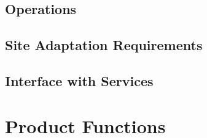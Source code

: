 \documentclass{scrreprt}
\begin{document}
\subsection{Operations}

\subsection{Site Adaptation Requirements}

\subsection{Interface with Services}

 
\section{Product Functions}

\end{document}
